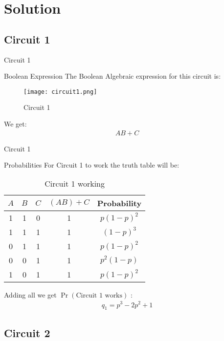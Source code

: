\documentclass{beamer}
\providecommand{\pr}[1]{\ensuremath{\Pr\left(#1\right)}}
\begin{document}
\section{Solution}
\subsection{Circuit 1}
\begin{frame}{Circuit 1}
\begin{block}{Boolean Expression}
The Boolean Algebraic expression for this circuit is:
    \begin{figure}
        \centering
        \texttt{[image: circuit1.png]}
        \caption{Circuit 1}
        \label{cir1_label}
    \end{figure}
    We get:
    \begin{align}
        AB + C
    \end{align}
\end{block}
\end{frame}
\begin{frame}{Circuit 1}
\begin{block}{Probabilities}
    For Circuit 1 to work the truth table will be:
    \begin{table}[h]
    \centering
    \begin{tabular}{|c|c|c|c|c|}
    \hline
         $A$ & $B$ & $C$ & $(AB) + C$& Probability \\
         \hline
         1 &1  & 0 &1 &$p(1-p)^2$\\\hline
         1&1&1&1&$(1-p)^3$\\\hline
         0&1&1&1&$p(1-p)^2$\\\hline
         0&0&1&1&$p^2(1-p)$\\\hline
         1&0&1&1&$p(1-p)^2$\\
    \hline
    \end{tabular}
    \caption{Circuit 1 working}
    \label{table_1}
\end{table}
    Adding all we get $\pr{\text{Circuit 1 works}}$ :
    \begin{align}
        q_1 = p^3-2p^2+1 \label{q_1_label}
    \end{align}
\end{block}
\end{frame}
\subsection{Circuit 2}
\end{document}
